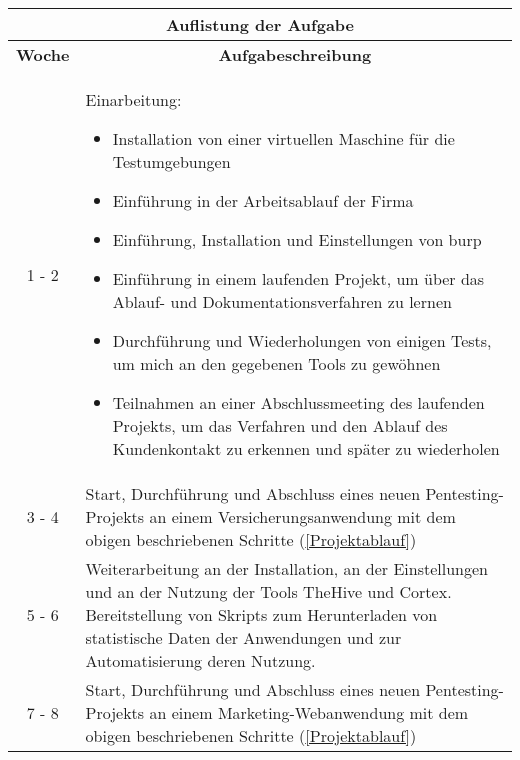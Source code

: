 \begin{table}[H]
    \begin{tabularx}{\textwidth}{|c|X|}
    \toprule
    \multicolumn{2}{c}{\textbf{Auflistung der Aufgabe}} \\
    \midrule
    \multicolumn{1}{c}{\textbf{Woche}} & \multicolumn{1}{c}{\textbf{Aufgabeschreibung}} \\
    \hline
    1 - 2    & Einarbeitung:
                \begin{itemize}
                    \item Installation von einer virtuellen Maschine für die Testumgebungen
                    \item Einführung in der Arbeitsablauf der Firma
                    \item Einführung, Installation und Einstellungen von \gls{burp}
                    \item Einführung in einem laufenden Projekt, um über das Ablauf- und Dokumentationsverfahren zu lernen
                    \item Durchführung und Wiederholungen von einigen Tests, um mich an den gegebenen Tools zu gewöhnen
                    \item Teilnahmen an einer Abschlussmeeting des laufenden Projekts, um das Verfahren und den Ablauf des Kundenkontakt zu erkennen und später zu wiederholen
                \end{itemize} \\
        \hline

    3 - 4       &  Start, Durchführung und Abschluss eines neuen Pentesting-Projekts an einem Versicherungsanwendung mit dem obigen beschriebenen Schritte (\ref{Projektablauf})  \\ 
    
    \hline

    5 - 6       & Weiterarbeitung an der Installation, an der Einstellungen und an der Nutzung der Tools \gls{TheHive} und \gls{Cortex}. Bereitstellung von Skripts zum Herunterladen von statistische Daten der Anwendungen und zur Automatisierung deren Nutzung.  \\ 

    \hline

    7 - 8      &  Start, Durchführung und Abschluss eines neuen Pentesting-Projekts an einem Marketing-Webanwendung mit dem obigen beschriebenen Schritte (\ref{Projektablauf}) \\

    \hline


\end{tabularx}
\end{table}
